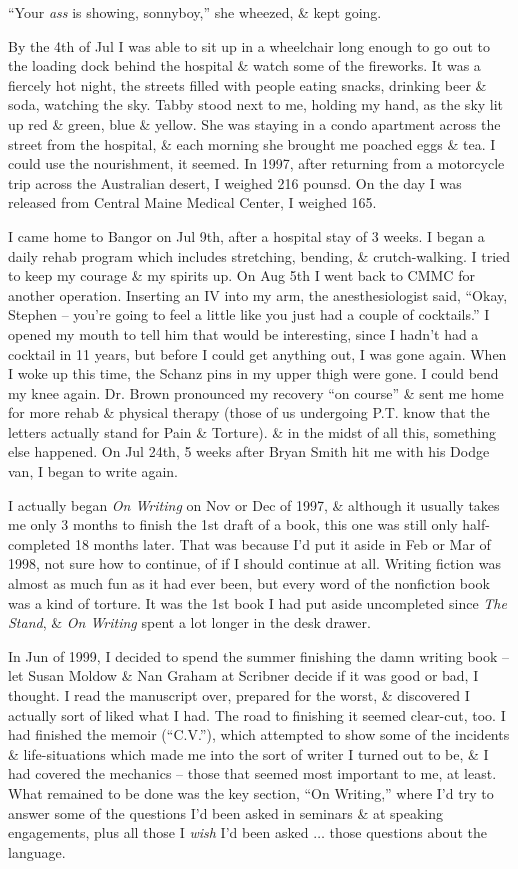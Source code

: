 \documentclass{article}
\numberwithin{equation}{section}
\begin{document}
``Your \textit{ass} is showing, sonnyboy,'' she wheezed, \& kept going.

By the 4th of Jul I was able to sit up in a wheelchair long enough to go out to the loading dock behind the hospital \& watch some of the fireworks. It was a fiercely hot night, the streets filled with people eating snacks, drinking beer \& soda, watching the sky. Tabby stood next to me, holding my hand, as the sky lit up red \& green, blue \& yellow. She was staying in a condo apartment across the street from the hospital, \& each morning she brought me poached eggs \& tea. I could use the nourishment, it seemed. In 1997, after returning from a motorcycle trip across the Australian desert, I weighed 216 pounsd. On the day I was released from Central Maine Medical Center, I weighed 165.

I came home to Bangor on Jul 9th, after a hospital stay of 3 weeks. I began a daily rehab program which includes stretching, bending, \& crutch-walking. I tried to keep my courage \& my spirits up. On Aug 5th I went back to CMMC for another operation. Inserting an IV into my arm, the anesthesiologist said, ``Okay, Stephen -- you're going to feel a little like you just had a couple of cocktails.'' I opened my mouth to tell him that would be interesting, since I hadn't had a cocktail in 11 years, but before I could get anything out, I was gone again. When I woke up this time, the Schanz pins in my upper thigh were gone. I could bend my knee again. Dr. Brown pronounced my recovery ``on course'' \& sent me home for more rehab \& physical therapy (those of us undergoing P.T. know that the letters actually stand for Pain \& Torture). \& in the midst of all this, something else happened. On Jul 24th, 5 weeks after Bryan Smith hit me with his Dodge van, I began to write again.

 I actually began \textit{On Writing} on Nov or Dec of 1997, \& although it usually takes me only 3 months to finish the 1st draft of a book, this one was still only half-completed 18 months later. That was because I'd put it aside in Feb or Mar of 1998, not sure how to continue, of if I should continue at all. Writing fiction was almost as much fun as it had ever been, but every word of the nonfiction book was a kind of torture. It was the 1st book I had put aside uncompleted since \textit{The Stand}, \& \textit{On Writing} spent a lot longer in the desk drawer.

In Jun of 1999, I decided to spend the summer finishing the damn writing book -- let Susan Moldow \& Nan Graham at Scribner decide if it was good or bad, I thought. I read the manuscript over, prepared for the worst, \& discovered I actually sort of liked what I had. The road to finishing it seemed clear-cut, too. I had finished the memoir (``C.V.''), which attempted to show some of the incidents \& life-situations which made me into the sort of writer I turned out to be, \& I had covered the mechanics -- those that seemed most important to me, at least. What remained to be done was the key section, ``On Writing,'' where I'd try to answer some of the questions I'd been asked in seminars \& at speaking engagements, plus all those I \textit{wish} I'd been asked $\ldots$ those questions about the language.
\end{document}

